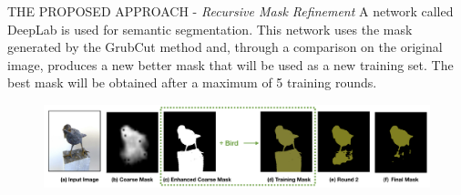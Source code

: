 \begin{frame}{THE PROPOSED APPROACH - \emph{Recursive Mask Refinement}}
    A network called DeepLab  is used for semantic segmentation. This 
    network uses the mask generated by the GrubCut method and, through a 
    comparison on the original image, produces a new better mask that will 
    be used as a new training set. The best mask will be obtained after a 
    maximum of 5 training rounds.
    \begin{figure}[h!]
        \centering
        \includegraphics[width = 1 \linewidth]{images/paper6/DeepLab.png}
        \centering
    \end{figure}
\end{frame}

